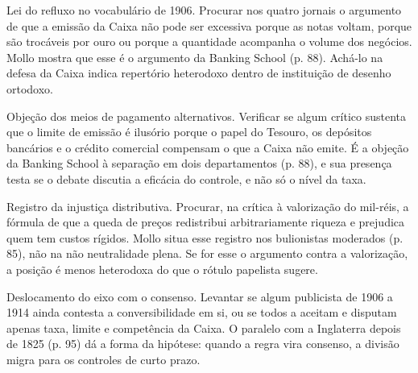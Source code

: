 \begin{dialogo}
\item Lei do refluxo no vocabulário de 1906. Procurar nos quatro jornais o
argumento de que a emissão da Caixa não pode ser excessiva porque as notas
voltam, porque são trocáveis por ouro ou porque a quantidade acompanha o volume
dos negócios. Mollo mostra que esse é o argumento da Banking School (p. 88).
Achá-lo na defesa da Caixa indica repertório heterodoxo dentro de instituição de
desenho ortodoxo.

\item Objeção dos meios de pagamento alternativos. Verificar se algum crítico
sustenta que o limite de emissão é ilusório porque o papel do Tesouro, os
depósitos bancários e o crédito comercial compensam o que a Caixa não emite. É a
objeção da Banking School à separação em dois departamentos (p. 88), e sua
presença testa se o debate discutia a eficácia do controle, e não só o nível da
taxa.

\item Registro da injustiça distributiva. Procurar, na crítica à valorização do
mil-réis, a fórmula de que a queda de preços redistribui arbitrariamente riqueza
e prejudica quem tem custos rígidos. Mollo situa esse registro nos bulionistas
moderados (p. 85), não na não neutralidade plena. Se for esse o argumento contra
a valorização, a posição é menos heterodoxa do que o rótulo papelista sugere.

\item Deslocamento do eixo com o consenso. Levantar se algum publicista de 1906
a 1914 ainda contesta a conversibilidade em si, ou se todos a aceitam e disputam
apenas taxa, limite e competência da Caixa. O paralelo com a Inglaterra depois
de 1825 (p. 95) dá a forma da hipótese: quando a regra vira consenso, a divisão
migra para os controles de curto prazo.
\end{dialogo}

